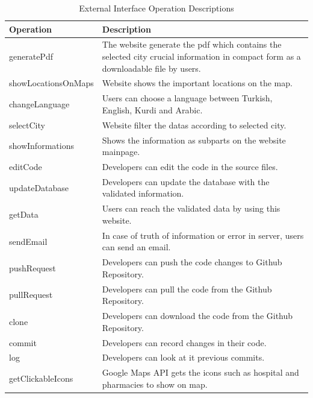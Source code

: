 \begin{center}
    \begin{table}[H]
        \begin{tabular}{| m{6cm}| m{8cm} |}
            \hline
            \textbf{Operation} & \textbf{Description} \\
            \hline
            generatePdf & The website generate the pdf which contains the selected city crucial information in compact form as a downloadable file by users.\\
            \hline
            showLocationsOnMaps & Website shows the important locations on the map.\\
            \hline
            changeLanguage & Users can choose a language between Turkish, English, Kurdi and Arabic.\\
            \hline
            selectCity & Website filter the datas according to selected city.\\
            \hline
            showInformations & Shows the information as subparts on the website mainpage.\\
            \hline
            editCode & Developers can edit the code in the source files.\\
            \hline
            updateDatabase & Developers can update the database with the validated information.\\
            \hline
            getData & Users can reach the validated data by using this website.\\
            \hline
            sendEmail & In case of truth of information or error in server, users can send an email.\\
            \hline
            pushRequest & Developers can push the code changes to Github Repository.\\
            \hline
            pullRequest & Developers can pull the code from the Github Repository.\\
            \hline
            clone & Developers can download the code from the Github Repository.\\
            \hline
            commit & Developers can record changes in their code.\\
            \hline
            log & Developers can look at it previous commits.\\
            \hline
            getClickableIcons & Google Maps API gets the icons such as hospital and pharmacies to show on map.\\
            \hline
        \end{tabular}
        \caption[External Interface Operation Descriptions]{External Interface Operation Descriptions}
    \end{table}
\end{center}

